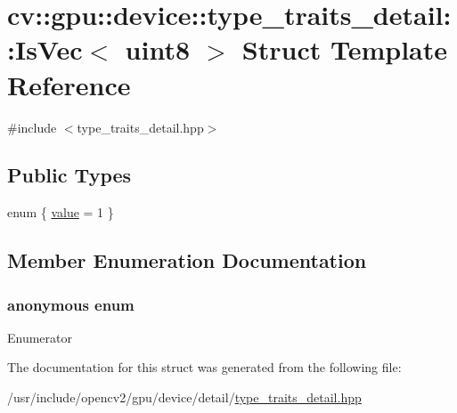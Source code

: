 \hypertarget{structcv_1_1gpu_1_1device_1_1type__traits__detail_1_1IsVec_3_01uint8_01_4}{\section{cv\-:\-:gpu\-:\-:device\-:\-:type\-\_\-traits\-\_\-detail\-:\-:Is\-Vec$<$ uint8 $>$ Struct Template Reference}
\label{structcv_1_1gpu_1_1device_1_1type__traits__detail_1_1IsVec_3_01uint8_01_4}
}


{\ttfamily \#include $<$type\-\_\-traits\-\_\-detail.\-hpp$>$}

\subsection*{Public Types}
\begin{DoxyCompactItemize}
\item 
enum \{ \hyperlink{structcv_1_1gpu_1_1device_1_1type__traits__detail_1_1IsVec_3_01uint8_01_4_aa2e857793c46f96b9d202353db4bf6f5a1a441a95ba3072bda64e38ccf534fbf0}{value} = 1
 \}
\end{DoxyCompactItemize}


\subsection{Member Enumeration Documentation}
\hypertarget{structcv_1_1gpu_1_1device_1_1type__traits__detail_1_1IsVec_3_01uint8_01_4_aa2e857793c46f96b9d202353db4bf6f5}{\subsubsection[{anonymous enum}]{\setlength{\rightskip}{0pt plus 5cm}anonymous enum}}\label{structcv_1_1gpu_1_1device_1_1type__traits__detail_1_1IsVec_3_01uint8_01_4_aa2e857793c46f96b9d202353db4bf6f5}
\begin{Desc}
\item[Enumerator]\par
\begin{description}
\item[{\em 
\hypertarget{structcv_1_1gpu_1_1device_1_1type__traits__detail_1_1IsVec_3_01uint8_01_4_aa2e857793c46f96b9d202353db4bf6f5a1a441a95ba3072bda64e38ccf534fbf0}{value}\label{structcv_1_1gpu_1_1device_1_1type__traits__detail_1_1IsVec_3_01uint8_01_4_aa2e857793c46f96b9d202353db4bf6f5a1a441a95ba3072bda64e38ccf534fbf0}
}]\end{description}
\end{Desc}


The documentation for this struct was generated from the following file\-:\begin{DoxyCompactItemize}
\item 
/usr/include/opencv2/gpu/device/detail/\hyperlink{type__traits__detail_8hpp}{type\-\_\-traits\-\_\-detail.\-hpp}\end{DoxyCompactItemize}
